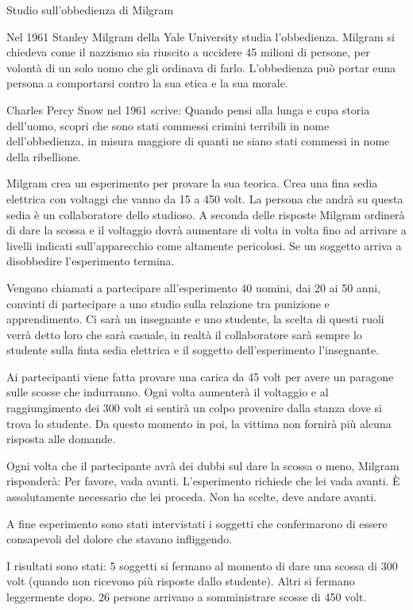 \documentclass[12pt]{book} %
\begin{document}
\begin{mdframed}[linewidth=1pt]
Studio sull'obbedienza di Milgram

Nel 1961 Stanley Milgram della Yale University studia l'obbedienza. Milgram si chiedeva come il
nazzismo sia riuscito a uccidere 45 milioni di persone, per volontà di un solo uomo che gli ordinava di farlo.
L'obbedienza può portar euna persona a comportarsi contro la sua etica e la sua morale.

Charles Percy Snow nel 1961 scrive: Quando pensi alla lunga e cupa storia dell'uomo, scopri che
sono stati commessi crimini terribili in nome dell'obbedienza, in misura maggiore di quanti ne
siano stati commessi in nome della ribellione.

Milgram crea un esperimento per provare la sua teorica. Crea una fina sedia elettrica con voltaggi che vanno da 15 a 450
volt. La persona che andrà su questa sedia è un collaboratore dello studioso. A seconda delle risposte Milgram ordinerà
di dare la scossa e il voltaggio dovrà aumentare di volta in volta fino ad arrivare a livelli indicati sull'apparecchio
come {\textquotedbl}altamente pericolosi{\textquotedbl}. Se un soggetto arriva a disobbedire l'esperimento termina.

Vengono chiamati a partecipare all'esperimento 40 uomini, dai 20 ai 50 anni, convinti di partecipare a uno studio sulla
relazione tra punizione e apprendimento. Ci sarà un {\textquotedbl}insegnante{\textquotedbl} e uno
{\textquotedbl}studente{\textquotedbl}, la scelta di questi ruoli verrà detto loro che sarà casuale, in realtà il
collaboratore sarà sempre lo studente sulla finta sedia elettrica e il soggetto dell'esperimento l'insegnante.

Ai partecipanti viene fatta provare una carica da 45 volt per avere un paragone sulle scosse che indurranno. Ogni volta
aumenterà il voltaggio e al raggiungimento dei 300 volt si sentirà un colpo provenire dalla stanza dove si trova lo
studente. Da questo momento in poi, la vittima non fornirà più alcuna risposta alle domande.

Ogni volta che il partecipante avrà dei dubbi sul dare la scossa o meno, Milgram risponderà: Per favore, vada avanti.
L'esperimento richiede che lei vada avanti. È assolutamente necessario che lei proceda. Non ha
scelte, deve andare avanti.

A fine esperimento sono stati intervistati i soggetti che confermarono di essere consapevoli del dolore che stavano
infliggendo. 

I risultati sono stati: 5 soggetti si fermano al momento di dare una scossa di 300 volt (quando non ricevono più
risposte dallo studente). Altri si fermano leggermente dopo. 26 persone arrivano a somministrare scosse di 450 volt.


\end{mdframed}
\end{document}
